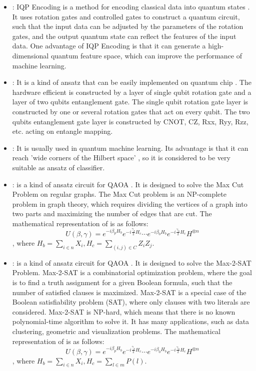 \begin{itemize}
    \item \IQPEncoding: IQP Encoding is a method for encoding classical data into quantum states \cite{Havlíček2019}. It uses rotation gates and controlled gates to construct a quantum circuit, such that the input data can be adjusted by the parameters of the rotation gates, and the output quantum state can reflect the features of the input data. One advantage of IQP Encoding is that it can generate a high-dimensional quantum feature space, which can improve the performance of machine learning.

    \item \HardwareEfficientAnsatz: It is a kind of ansatz that can be easily implemented on quantum chip \cite{Kandala2017}. The hardware efficient is constructed by a layer of single qubit rotation gate and a layer of two qubits entanglement gate. The single qubit rotation gate layer is constructed by one or several rotation gates that act on every qubit. The two qubits entanglement gate layer is constructed by CNOT, CZ, Rxx, Ryy, Rzz, etc. acting on entangle mapping.

    \item \StronglyEntangling: It is usually used in quantum machine learning. Its advantage is that it can reach 'wide corners of the Hilbert space' \cite{Schuld_2020}, so it is considered to be very suitable as ansatz of classifier.

    \item \MaxCutAnsatz: \MaxCutAnsatz is a kind of ansatz circuit for QAOA \cite{farhi2014quantum}. It is designed to solve the Max Cut Problem on regular graphs. The Max Cut problem is an NP-complete problem in graph theory, which requires dividing the vertices of a graph into two parts and maximizing the number of edges that are cut. The mathematical representation of \MaxCutAnsatz is as follows:
          $$U(\beta, \gamma) = e^{-i\beta_pH_b}e^{-i\frac{\gamma_p}{2}H_c}
              \cdots e^{-i\beta_0H_b}e^{-i\frac{\gamma_0}{2}H_c}H^{\otimes n}$$,
          where $H_b = \sum_{i\in n}X_{i}, H_c = \sum_{(i,j)\in C}Z_iZ_j$.

    \item \MaxToSATAnsatz: \MaxToSATAnsatz is a kind of ansatz circuit for QAOA \cite{Akshay_2020}. It is designed to solve the Max-2-SAT Problem. Max-2-SAT is a combinatorial optimization problem, where the goal is to find a truth assignment for a given Boolean formula, such that the number of satisfied clauses is maximized. Max-2-SAT is a special case of the Boolean satisfiability problem (SAT), where only clauses with two literals are considered. Max-2-SAT is NP-hard, which means that there is no known polynomial-time algorithm to solve it. It has many applications, such as data clustering, geometric and visualization problems. The mathematical representation of \MaxToSATAnsatz is as follows:
          $$U(\beta, \gamma) = e^{-i\beta_pH_b}e^{-i\frac{\gamma_p}{2}H_c}
              \cdots e^{-i\beta_0H_b}e^{-i\frac{\gamma_0}{2}H_c}H^{\otimes n}$$,
          where $H_b = \sum_{i\in n}X_{i}, H_c = \sum_{l\in m}P(l)$.


\end{itemize}
